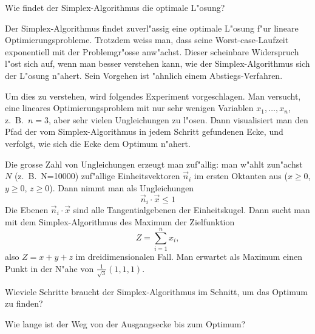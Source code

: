 \begin{aufgabe}
Wie findet der Simplex-Algorithmus die optimale L"osung?
\end{aufgabe}

{\parindent 0pt Der Simplex-Algorithmus}
findet zuverl"assig eine optimale L"osung f"ur lineare Optimierungsprobleme.
Trotzdem weiss man, dass seine Worst-case-Laufzeit exponentiell mit der
Problemgr"osse anw"achst. Dieser scheinbare Widerspruch l"ost sich auf,
wenn man besser verstehen kann, wie der Simplex-Algorithmus sich der
L"osung n"ahert.  Sein Vorgehen ist "ahnlich einem Abstiegs-Verfahren.

Um dies zu verstehen, wird folgendes Experiment vorgeschlagen. Man
versucht, eine lineares Optimierungsproblem mit nur sehr wenigen Variablen
$x_1,\dots,x_n$, z.~B.~$n=3$, aber sehr vielen Ungleichungen zu l"osen.
Dann visualisiert man den Pfad der vom Simplex-Algorithmus in jedem
Schritt gefundenen Ecke, und verfolgt, wie sich die Ecke dem Optimum
n"ahert.

Die grosse Zahl von Ungleichungen erzeugt man zuf"allig: man w"ahlt
zun"achst $N$ (z.~B.~N=10000) zuf"allige Einheitsvektoren $\vec n_i$ im ersten
Oktanten aus ($x\ge 0$, $y\ge 0$, $z\ge 0$). Dann nimmt man als
Ungleichungen
\[
\vec n_i\cdot \vec x\le 1
\]
Die Ebenen $\vec n_i\cdot \vec x$ sind alle Tangentialgebenen
der Einheitskugel. Dann sucht man mit dem Simplex-Algorithmus des
Maximum der Zielfunktion 
\[
Z=\sum_{i=1}^nx_i,
\]
also $Z=x+y+z$ im dreidimensionalen Fall. Man erwartet als Maximum
einen Punkt in der N"ahe von $\frac1{\sqrt{3}}(1,1,1)$.

\begin{compactenum}
\item Wieviele Schritte braucht der Simplex-Algorithmus im Schnitt,
um das Optimum zu finden?
\item Wie lange ist der Weg von der Ausgangsecke bis zum Optimum?
\end{compactenum}

